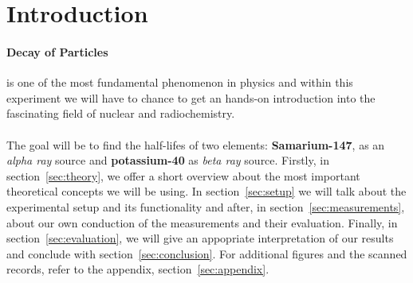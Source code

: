 \section{Introduction}
\label{sec:introduction}
\paragraph{Decay of Particles} is one of the most fundamental phenomenon
in physics and within this experiment we will have to chance
to get an hands-on introduction into the fascinating field of nuclear and radiochemistry. \\\\ 
The goal will be to find the half-lifes of two elements: \textbf{Samarium-147}, as an \textit{alpha ray}
source and \textbf{potassium-40} as \textit{beta ray} source. Firstly, in section~\ref{sec:theory}, 
we offer a short overview about the most important theoretical concepts we will be using.
In section~\ref{sec:setup} we will talk about the experimental setup and its 
functionality and after, in section~\ref{sec:measurements}, about our
own conduction of the measurements and their evaluation. Finally, in section~\ref{sec:evaluation},
we will give an appopriate interpretation of our results and conclude with
section~\ref{sec:conclusion}. For additional figures and the scanned records,
refer to the appendix, section~\ref{sec:appendix}.
